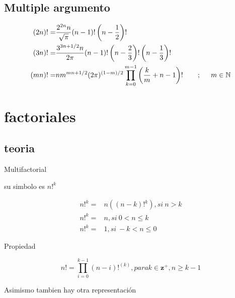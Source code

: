 \subsection{Multiple argumento}

\begin{align*}
	(2n)!= & \dfrac{2^{2n} n }{\sqrt{\pi}} (n-1)!\left( n-\dfrac{1}{2}\right)!
	\\
	(3n)!= & \dfrac{3^{3n+1/2} n }{2\pi} (n-1)!\left( n-\dfrac{2}{3}\right)! \left( n-\dfrac{1}{3}\right)!
	\\
	(mn)!= & nm^{mn+1/2} (2 \pi)^{(1-m)/2}  \prod_{k=0}^{m-1} \left(  \dfrac{k}{m}+n-1\right) ! \hspace{0.5cm}\ \ ; \hspace{.5cm} m \in \mathbb{N}
\end{align*}

































\section{factoriales}
\subsection{teoria}

Multifactorial

su simbolo es $n!^{k} $


\begin{align*}
	n!^{k} = & n((n-k)!^{k}), si  \ n> k \\
	n!^{k} = & n, si  \ 0<n\leq k        \\
	n!^{k} = & 1, si  \ -k<n\leq 0
\end{align*}

Propiedad

$$
	n!=\prod_{i=0}^{k-1} (n-i)!^{(k)}, para k \in \mathbf{z}^+ , n\geq k-1
$$


Asimismo tambien hay otra representación

